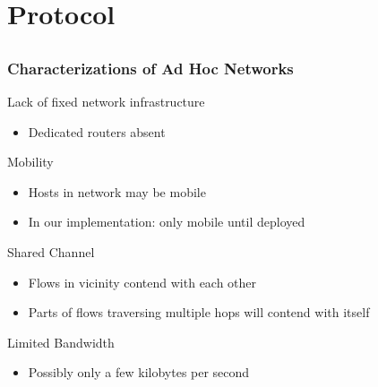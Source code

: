 \section{Protocol}
\subsection*{}


\begin{frame}[t]
  \frametitle{Characterizations of Ad Hoc Networks}
  
  Lack of fixed network infrastructure
  \begin{itemize}
  \item Dedicated routers absent
  \end{itemize}

  \vfill
  
  Mobility
  \begin{itemize}
  \item Hosts in network may be mobile
  \item In our implementation: only mobile until deployed
  \end{itemize}

  \vfill

  Shared Channel
  \begin{itemize}
  \item Flows in vicinity contend with each other
  \item Parts of flows traversing multiple hops will contend with itself
  \end{itemize}

  \vfill

  Limited Bandwidth
  \begin{itemize}
  \item Possibly only a few kilobytes per second
  \end{itemize}

  \vfill

  \begin{flushleft}
    \begin{tiny}
      \begin{minipage}{1.0\linewidth}
      \end{minipage}
    \end{tiny}
  \end{flushleft}
  
\end{frame}

